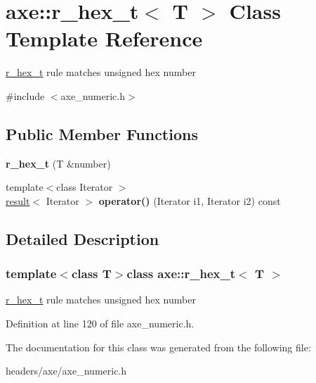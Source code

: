 \hypertarget{classaxe_1_1r__hex__t}{\section{axe\+:\+:r\+\_\+hex\+\_\+t$<$ T $>$ Class Template Reference}
\label{classaxe_1_1r__hex__t}
}


\hyperlink{classaxe_1_1r__hex__t}{r\+\_\+hex\+\_\+t} rule matches unsigned hex number  




{\ttfamily \#include $<$axe\+\_\+numeric.\+h$>$}

\subsection*{Public Member Functions}
\begin{DoxyCompactItemize}
\item 
\hypertarget{classaxe_1_1r__hex__t_af7d90bba74bd2cedb42bdb9d9bdc3c1b}{{\bfseries r\+\_\+hex\+\_\+t} (T \&number)}\label{classaxe_1_1r__hex__t_af7d90bba74bd2cedb42bdb9d9bdc3c1b}

\item 
\hypertarget{classaxe_1_1r__hex__t_ad238d73a2c361329d658e89f2fa1913d}{{\footnotesize template$<$class Iterator $>$ }\\\hyperlink{structaxe_1_1result}{result}$<$ Iterator $>$ {\bfseries operator()} (Iterator i1, Iterator i2) const }\label{classaxe_1_1r__hex__t_ad238d73a2c361329d658e89f2fa1913d}

\end{DoxyCompactItemize}


\subsection{Detailed Description}
\subsubsection*{template$<$class T$>$class axe\+::r\+\_\+hex\+\_\+t$<$ T $>$}

\hyperlink{classaxe_1_1r__hex__t}{r\+\_\+hex\+\_\+t} rule matches unsigned hex number 

Definition at line 120 of file axe\+\_\+numeric.\+h.



The documentation for this class was generated from the following file\+:\begin{DoxyCompactItemize}
\item 
headers/axe/axe\+\_\+numeric.\+h\end{DoxyCompactItemize}
